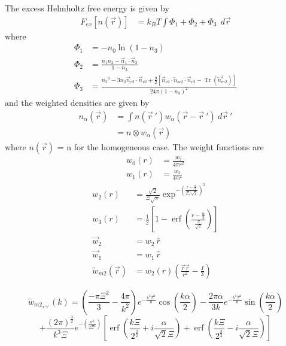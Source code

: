 \documentclass[double,12pt]{revtex4-2}
\begin{document}
The excess Helmholtz free energy is given by
\begin{align}
    F_{{ex}}[n(\vec r)] &= k_BT\int\Phi_1
    +\Phi_2+\Phi_3~~d\vec r
\end{align}     
where
\begin{align}
    \Phi_1 &= -n_{0}\ln(1-n_{3}) \\
    \Phi_2 &= \frac{n_1n_2-\vec n_1\cdot\vec n_2}{1-n_3} \\
    \Phi_3 &= \frac{{n_2}^3-3n_2\vec n_{v2}\cdot\vec n_{v2}+\frac{9}{2}
       [\vec n_{v2}\cdot{\overleftrightarrow{n}_{m2}}\cdot{\vec n_{v2}}
       -\operatorname{Tr}({\overleftrightarrow n^3_{m2}})]}{24\pi(1-n_3)^2}  
\end{align}
and the weighted densities are given by 
\begin{align}
    n_\alpha(\vec r) &= \int n(\vec {r}~')w_\alpha(\vec r-\vec {r}~')
                    ~d\vec {r}~'  \label{weighted_densities}  \\
                     &= n\otimes w_\alpha(\vec r)
\end{align}  
where $n(\vec r)$ = n for the homogeneous case.
The weight functions are
\begin{align}\label{eq:weights}
  w_{0}(r) &=\frac{w_{2}}{4\pi{r}^2} \\
  w_{1}(r) &=\frac{w_{2}}{4\pi{r}} 
\end{align}
\begin{align}
  w_2(r) &=\frac{\sqrt{2}}{\Xi\sqrt\pi}\exp^{-\left(\frac{r-\frac{\alpha}
           {2}}{\Xi/\sqrt{2}}\right)^2}  \\
  w_3(r) &=\frac{1}{2}\left[1-\operatorname{erf}\left(\frac{r
          -\frac{\alpha}{2}}{\frac{\Xi}{\sqrt{2}}}\right)\right]  \\
%    
      \vec {w}_2 &= w_2~\hat r \\
      \vec {w}_1 &= w_1~\hat r \\
      \overleftrightarrow{w}_{m2}(\vec{r}) &= w_2(r)\left(\frac{\vec{r}
                                        \vec{r}}{r^2}-\frac{I}{3}\right) 
\end{align}

\begin{equation}
    {\widetilde{w}_{{m2}_{x'x'}}(k)=\left(\frac{-\pi{\Xi}^2}{3}
   -\frac{4\pi}{k^2}\right)e^{-\frac{k^2\Xi^2}{8}}\cos(\frac{k\alpha}{2})
   -\frac{2\pi\alpha}{3k}e^{-\frac{k^2\Xi^2}{8}}\sin(\frac{k\alpha}{2})}
   \nonumber
\end{equation} 
\begin{equation} %
   {+\frac{{(2\pi)}^{\frac{3}{2}}}{k^3\Xi}e^{-\left(\frac{\alpha^2}
   {2\Xi^2}\right)}\left[\operatorname{erf}\left(\frac{k\Xi}{2^\frac{3}{2}}
   +i\frac{\alpha}{\sqrt{2}\Xi}\right)+\operatorname{erf}\left(\frac{k\Xi}
   {2^\frac{3}{2}}-i\frac{\alpha}{\sqrt{2}\Xi}\right)\right]}
\end{equation} 
\end{document}
